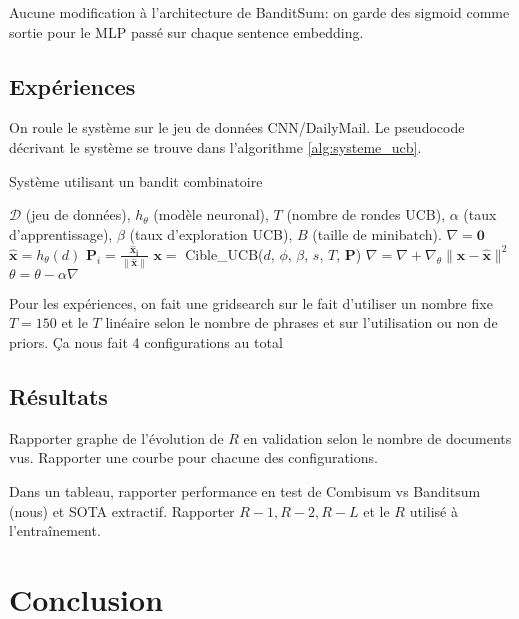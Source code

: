 Aucune modification à l'architecture de BanditSum: on garde des sigmoid comme sortie
pour le MLP passé sur chaque sentence embedding.

\subsection{Expériences}

On roule le système sur le jeu de données CNN/DailyMail.
Le pseudocode décrivant le système se trouve dans l'algorithme \ref{alg:systeme_ucb}.

\begin{algorithm}
    \caption{Système utilisant un bandit combinatoire}
    \begin{algorithmic}[1]
        \Require  $\mathcal{D}$ (jeu de données), $h_\theta$ (modèle neuronal), $T$ (nombre de rondes UCB), $\alpha$ (taux d'apprentissage), $\beta$ (taux d'exploration UCB), $B$ (taille de minibatch).
         
        \State $\nabla = \mathbf{0}$
        \State $\mathbf{\hat{x}} = h_\theta(d)$
        \State $\mathbf{P}_i = \frac{\mathbf{\hat{x}_i}}{\lVert \mathbf{\hat{x}} \rVert}$
        \EndFor
        \State $\mathbf{x} = $ Cible\_UCB($d$, $\phi$, $\beta$, $s$, $T$, $\mathbf{P}$)
        \State $\nabla = \nabla + \nabla_\theta \lVert \mathbf{x} - \mathbf{\hat{x}} \rVert^2$
        \EndFor
        \State $\theta = \theta - \alpha \nabla$
        \EndWhile
    \end{algorithmic}
    \label{alg:systeme_ucb}
\end{algorithm}

Pour les expériences, on fait une gridsearch sur le fait d'utiliser
un nombre fixe $T=150$ et le $T$ linéaire selon le nombre de phrases et sur l'utilisation
ou non de priors.
Ça nous fait 4 configurations au total

\subsection{Résultats}

Rapporter graphe de l'évolution de $R$ en validation selon le nombre de documents vus.
Rapporter une courbe pour chacune des configurations.

Dans un tableau, rapporter performance en test de Combisum vs Banditsum (nous) et
SOTA extractif.
Rapporter $R-1, R-2, R-L$ et le $R$ utilisé à l'entraînement.

\section{Conclusion}

